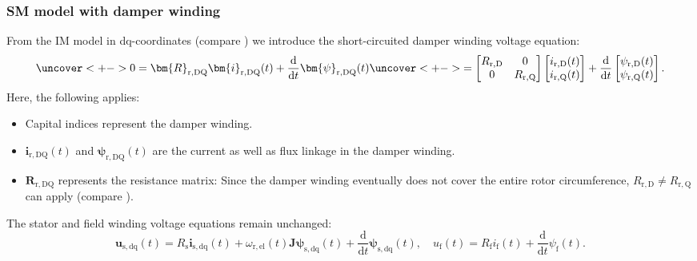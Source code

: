 \begin{frame}
	\frametitle{SM model with damper winding}
	From the IM model in dq-coordinates (compare ) we introduce the short-circuited damper winding voltage equation:
	\begin{equation}
		\uncover<+->{
		0 = \bm{R}_{\mathrm{r,DQ}} \bm{i}_{\mathrm{r,DQ}}(t) + \frac{\mathrm{d}}{\mathrm{d}t}\bm{\psi}_{\mathrm{r,DQ}}(t)} \uncover<+->{= \begin{bmatrix}
			R_\mathrm{r,D} & 0 \\ 0 & R_\mathrm{r,Q} 
		\end{bmatrix} \begin{bmatrix}
			i_{\mathrm{r,D}}(t) \\ i_{\mathrm{r,Q}}(t)
		\end{bmatrix} + \frac{\mathrm{d}}{\mathrm{d}t} \begin{bmatrix}
			\psi_{\mathrm{r,D}}(t) \\ \psi_{\mathrm{r,Q}}(t)
		\end{bmatrix}.}
		\label{eq:damper_winding_voltage}
	\end{equation}
	\onslide<+->
	Here, the following applies:
	\begin{itemize}
		\item<+-> Capital indices represent the damper winding.
		\item<+-> $\bm{i}_{\mathrm{r,DQ}}(t)$ and $\bm{\psi}_{\mathrm{r,DQ}}(t)$ are the current as well as flux linkage in the damper winding.
		\item<+-> $\bm{R}_{\mathrm{r,DQ}}$ represents the resistance matrix: Since the damper winding eventually does not cover the entire rotor circumference, $R_\mathrm{r,D}\neq R_\mathrm{r,Q}$ can apply (compare ). 
	\end{itemize} 
	\onslide<+->
	The stator and field winding voltage equations remain unchanged:
	$$\bm{u}_\mathrm{s,dq}(t) = R_\mathrm{s} \bm{i}_\mathrm{s,dq}(t)+ \omega_\mathrm{r,el}(t)\bm{J}\bm{\psi}_\mathrm{s,dq}(t) + \frac{\mathrm{d}}{\mathrm{d}t}\bm{\psi}_\mathrm{s,dq}(t), \quad u_\mathrm{f}(t) = R_\mathrm{f}i_\mathrm{f}(t)+\frac{\mathrm{d}}{\mathrm{d}t}\psi_\mathrm{f}(t).$$
\end{frame}

